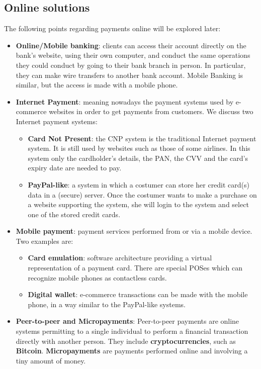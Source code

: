 \documentclass[a4paper, 10pt, titlepage]{article}
\begin{document}
\subsection{Online solutions}
The following points regarding payments online will be explored later:
\begin{itemize}
\item \textbf{Online/Mobile banking}: clients can access their account directly on the bank's website, using their own computer, and conduct the same operations they could conduct by going to their bank branch in person. In particular, they can make wire transfers to another bank account. Mobile Banking is similar, but the access is made with a mobile phone.
\item \textbf{Internet Payment}: meaning nowadays the payment systems used by e-commerce websites in order to get payments from customers. We discuss two Internet payment systems: 
	\begin{itemize}
	\item \textbf{Card Not Present}: the CNP system is the traditional Internet payment system. It is still used by websites such as those of some airlines. In this system only the cardholder's details, the PAN, the CVV and the card's expiry date are needed to pay.
	\item \textbf{PayPal-like}: a system in which a costumer can store her credit card(s) data in a (secure) server. Once the costumer wants to make a purchase on a website supporting the system, she will login to the system and select one of the stored credit cards. 
	\end{itemize}
\item \textbf{Mobile payment}: payment services performed from or via a mobile device. Two examples are:
	\begin{itemize}
	\item \textbf{Card emulation}: software architecture providing a virtual representation of a payment card. There are special POSes which can recognize mobile phones as contactless cards.
	\item \textbf{Digital wallet}: e-commerce transactions can be made with the mobile phone, in a way similar to the PayPal-like systems.
	\end{itemize}
\item \textbf{Peer-to-peer and Micropayments}: Peer-to-peer payments are online systems permitting to a single individual to perform a financial transaction directly with another person. They include \textbf{cryptocurrencies}, such as \textbf{Bitcoin}. 
\textbf{Micropayments} are payments performed online and involving a tiny amount of money.
\end{itemize}
\end{document}

